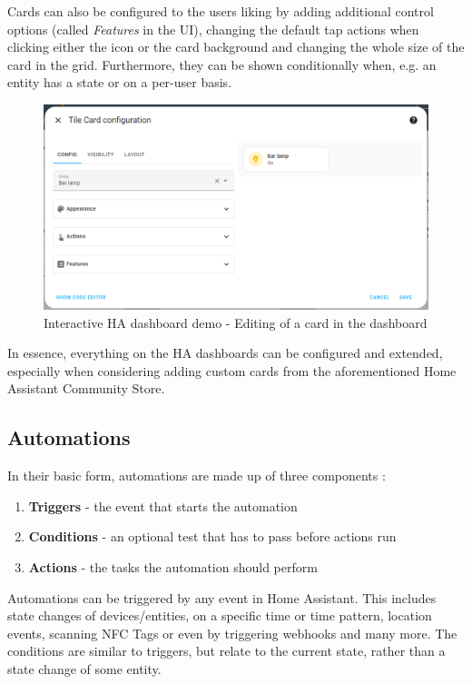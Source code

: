 Cards can also be configured to the users liking by adding additional control options (called \textit{Features} in the UI), changing the default tap actions when clicking either the icon or the card background and changing the whole size of the card in the grid. Furthermore, they can be shown conditionally when, e.g. an entity has a state or on a per-user basis.

\begin{figure}[H]
    \centering
    \includegraphics[width=.95\linewidth]{img/ha-dashboard-demo-editing-card.png}
    \caption{Interactive HA dashboard demo - Editing of a card in the dashboard \cite{HomeAssistant_Dashboard_Demo}}
    \label{fig:HA-Dashboard-Demo-Editing-Card}
\end{figure}

In essence, everything on the HA dashboards can be configured and extended, especially when considering adding custom cards from the aforementioned Home Assistant Community Store.

\subsection{Automations}
\label{sec:ha-automations}

In their basic form, automations are made up of three components \cite{HomeAssistant_Docs_Services}:

\begin{enumerate}
    \item \textbf{Triggers} - the event that starts the automation
    \item \textbf{Conditions} - an optional test that has to pass before actions run
    \item \textbf{Actions} - the tasks the automation should perform
\end{enumerate}

Automations can be triggered by any event in Home Assistant. This includes state changes of devices/entities, on a specific time or time pattern, location events, scanning NFC Tags or even by triggering webhooks and many more. The conditions are similar to triggers, but relate to the current state, rather than a state change of some entity.

